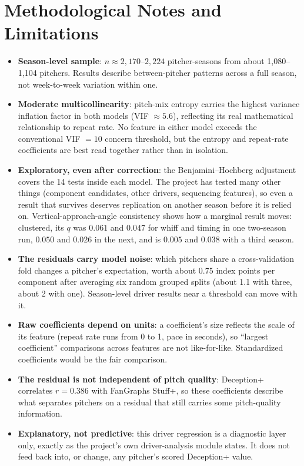 \documentclass[11pt]{article}
\begin{document}
\section*{Methodological Notes and Limitations}
\begin{itemize}
\item \textbf{Season-level sample}: $n \approx 2,170$--$2,224$ pitcher-seasons from about 1,080--1,104 pitchers. Results describe between-pitcher patterns across a full season, not week-to-week variation within one.
\item \textbf{Moderate multicollinearity}: pitch-mix entropy carries the highest variance inflation factor in both models (VIF $\approx 5.6$), reflecting its real mathematical relationship to repeat rate. No feature in either model exceeds the conventional VIF $=10$ concern threshold, but the entropy and repeat-rate coefficients are best read together rather than in isolation.
\item \textbf{Exploratory, even after correction}: the Benjamini--Hochberg adjustment covers the 14 tests inside each model. The project has tested many other things (component candidates, other drivers, sequencing features), so even a result that survives deserves replication on another season before it is relied on. Vertical-approach-angle consistency shows how a marginal result moves: clustered, its $q$ was $0.061$ and $0.047$ for whiff and timing in one two-season run, $0.050$ and $0.026$ in the next, and is $0.005$ and $0.038$ with a third season.
\item \textbf{The residuals carry model noise}: which pitchers share a cross-validation fold changes a pitcher's expectation, worth about 0.75 index points per component after averaging six random grouped splits (about 1.1 with three, about 2 with one). Season-level driver results near a threshold can move with it.
\item \textbf{Raw coefficients depend on units}: a coefficient's size reflects the scale of its feature (repeat rate runs from 0 to 1, pace in seconds), so ``largest coefficient'' comparisons across features are not like-for-like. Standardized coefficients would be the fair comparison.
\item \textbf{The residual is not independent of pitch quality}: Deception+ correlates $r=0.386$ with FanGraphs Stuff+, so these coefficients describe what separates pitchers on a residual that still carries some pitch-quality information.
\item \textbf{Explanatory, not predictive}: this driver regression is a diagnostic layer only, exactly as the project's own driver-analysis module states. It does not feed back into, or change, any pitcher's scored Deception+ value.
\end{itemize}
\end{document}
